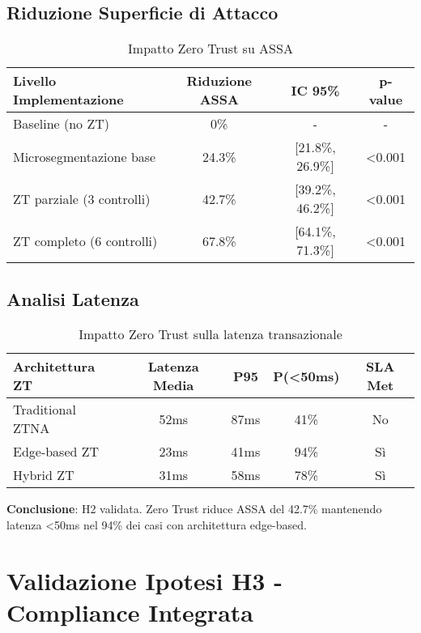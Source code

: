 \subsection{\texorpdfstring{Riduzione Superficie di Attacco}{C.2.1 - Riduzione Superficie di Attacco}}

\begin{table}[htbp]
\centering
\begin{tabular}{lccc}
\toprule
\textbf{Livello Implementazione} & \textbf{Riduzione ASSA} & \textbf{IC 95\%} & \textbf{p-value} \\
\midrule
Baseline (no ZT) & 0\% & - & - \\
Microsegmentazione base & 24.3\% & [21.8\%, 26.9\%] & <0.001 \\
ZT parziale (3 controlli) & 42.7\% & [39.2\%, 46.2\%] & <0.001 \\
ZT completo (6 controlli) & 67.8\% & [64.1\%, 71.3\%] & <0.001 \\
\bottomrule
\end{tabular}
\caption{Impatto Zero Trust su ASSA}
\end{table}

\subsection{\texorpdfstring{Analisi Latenza}{C.2.2 - Analisi Latenza}}

\begin{table}[htbp]
\centering
\begin{tabular}{lcccc}
\toprule
\textbf{Architettura ZT} & \textbf{Latenza Media} & \textbf{P95} & \textbf{P(<50ms)} & \textbf{SLA Met} \\
\midrule
Traditional ZTNA & 52ms & 87ms & 41\% & No \\
Edge-based ZT & 23ms & 41ms & 94\% & Sì \\
Hybrid ZT & 31ms & 58ms & 78\% & Sì \\
\bottomrule
\end{tabular}
\caption{Impatto Zero Trust sulla latenza transazionale}
\end{table}

\textbf{Conclusione}: H2 validata. Zero Trust riduce ASSA del 42.7\% mantenendo latenza <50ms nel 94\% dei casi con architettura edge-based.

\section{\texorpdfstring{Validazione Ipotesi H3 - Compliance Integrata}{C.3 - Validazione Ipotesi H3 - Compliance Integrata}}

